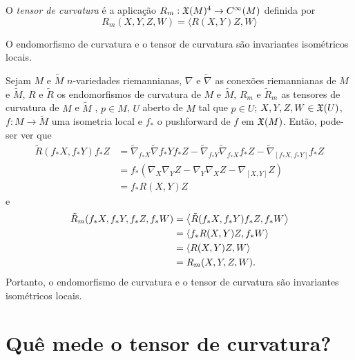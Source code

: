 
\begin{definicao}
	O \emph{tensor de curvatura} é a aplicação $R_m: \mathfrak{X}(M)^4 \rightarrow C^\infty(M)$ definida por
	\begin{equation*}
		R_m (X,Y,Z,W) = \langle R(X,Y)Z,W \rangle
	\end{equation*}
\end{definicao}

\begin{teorema}
	O endomorfismo de curvatura e o tensor de curvatura são invariantes isométricos locais.
\end{teorema}

\begin{demonstracao}
	Sejam $M$ e $\tilde{M}$ $n$-variedades riemannianas,
	$\nabla$ e $\tilde{\nabla}$ as conexões riemannianas de $M$ e $\tilde{M}$,
	$R$ e $\tilde{R}$ os endomorfismos de curvatura de $M$ e $\tilde{M}$,
	$R_m$ e $\tilde{R}_m$ as tensores de curvatura de $M$ e $\tilde{M}$ ,
	$p \in M$,
	$U$ aberto de $M$ tal que $p \in U$;
	$X,Y,Z,W \in \mathfrak{X}(U)$,
	$f: M \rightarrow \tilde{M}$ uma isometria local e
	$f_*$ o pushforward de $f$ em $\mathfrak{X}(M)$.
	Então, pode-ser ver que
	\begin{align*}
		\tilde{R}(f_*X, f_*Y)f_*Z &= \tilde{\nabla}_{f_*X} \tilde{\nabla} f_*Y f_*Z - \tilde{\nabla}_{f_*Y} \tilde{\nabla}_{f_*X} f_*Z - \tilde{\nabla}_{[f_*X, f_*Y]} f_*Z\\
		&= f_* \left(\nabla_X \nabla_Y Z - \nabla_Y \nabla_X Z - \nabla_{[X,Y]}Z\right)\\
		&= f_* R(X,Y)Z
	\end{align*}
	e
	\begin{align*}
		\tilde{R}_m(f_*X, f_*Y, f_*Z, f_*W)
		&= \left\langle \tilde{R}(f_*X, f_*Y)f_*Z,f_*W \right\rangle\\
		&= \left\langle f_* R(X,Y)Z,f_*W \right\rangle\\
		&= \left\langle R(X,Y)Z,W \right\rangle\\
		&= R_m(X,Y,Z,W).
	\end{align*}
	Portanto, o endomorfismo de curvatura e o tensor de curvatura são invariantes isométricos locais.
\end{demonstracao}

\section{Quê mede o tensor de curvatura?}

